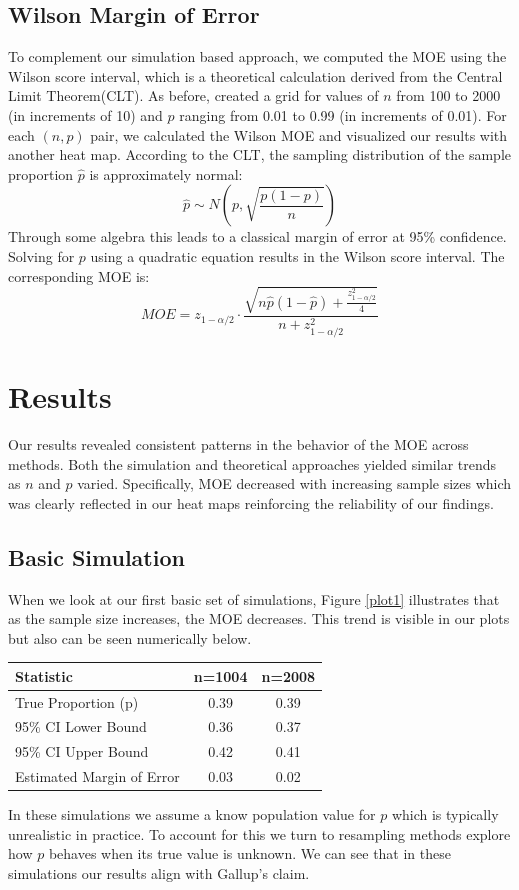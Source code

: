 \documentclass{article}\usepackage[]{graphicx}\usepackage[]{xcolor}
\begin{document}
\begin{multicols}{2}
\subsection{Wilson Margin of Error}
To complement our simulation based approach, we computed the MOE using the Wilson score interval, which is a theoretical calculation derived from the Central Limit Theorem(CLT). As before, created a grid for values of $n$ from 100 to 2000 (in increments of 10) and $p$ ranging from 0.01 to 0.99 (in increments of 0.01). For each $(n,p)$ pair, we calculated the Wilson MOE and visualized our results with another heat map. According to the CLT, the sampling distribution of the sample proportion $\hat{p}$ is approximately normal:
$$
\hat{p} \sim N\left(p, \sqrt{\frac{p(1-p)}{n}}\right)
$$
Through some algebra this leads to a classical margin of error at 95\% confidence. Solving for $p$ using a quadratic equation results in the Wilson score interval. The corresponding MOE is:
\[
MOE = z_{1 - \alpha/2} \cdot \frac{
\sqrt{n\hat{p}(1 - \hat{p}) + \frac{z^2_{1 - \alpha/2}}{4}}
}{
n + z^2_{1 - \alpha/2}
}
\]



\section{Results}
Our results revealed consistent patterns in the behavior of the MOE across methods. Both the simulation and theoretical approaches yielded similar trends as $n$ and $p$ varied. Specifically, MOE decreased with increasing sample sizes which was clearly reflected in our heat maps reinforcing the reliability of our findings.

\subsection{Basic Simulation}
When we look at our first basic set of simulations, Figure \ref{plot1} illustrates that as the sample size increases, the MOE decreases. This trend is visible in our plots but also can be seen numerically below.
\begin{table}[H]
\centering
\small
{}
\label{table}
\begin{tabular}{lcc}
  \hline
 Statistic & n=1004 & n=2008 \\ 
  \hline
 True Proportion (p) & 0.39 & 0.39 \\ 
   95\% CI Lower Bound & 0.36 & 0.37 \\ 
   95\% CI Upper Bound & 0.42 & 0.41 \\ 
   Estimated Margin of Error & 0.03 & 0.02 \\ 
   \hline
\end{tabular}
\end{table}
In these simulations we assume a know population value for $p$ which is typically unrealistic in practice. To account for this we turn to resampling methods explore how $p$ behaves when its true value is unknown. We can see that in these simulations our results align with Gallup's claim.


\end{multicols}
\end{document}
